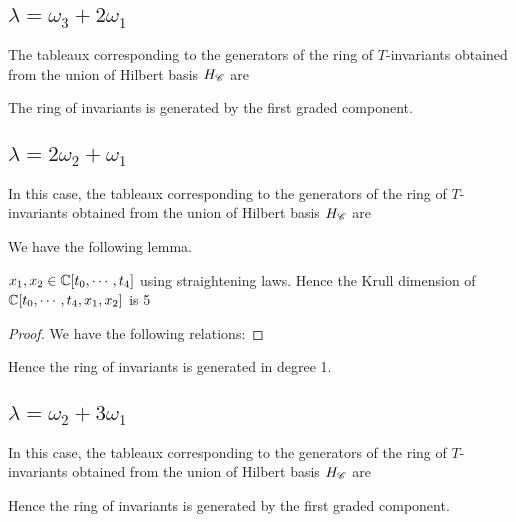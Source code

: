 \subsection{\(\lambda=\omega_3+2\omega_1\)}
\label{sec:fv_hb311}
The tableaux corresponding to the generators of the ring of $T$-invariants obtained from the union of Hilbert basis $H_{\mathscr{C}}$ are

The ring of invariants is generated by the first graded component.

\subsection{\(\lambda = 2\omega_2+\omega_1\)}
\label{sec:fv_hb221}
In this case, the tableaux corresponding to the generators of the ring of $T$-invariants obtained from the union of Hilbert basis $H_{\mathscr{C}}$ are

We have the following lemma.
\begin{lemma}
    \(x_1,x_2 \in \mathbb{C}[t_0,\cdots,t_4]\) using straightening laws. Hence the Krull dimension of \(\mathbb{C}[t_0,\cdots,t_4,x_1,x_2]\) is 5
\end{lemma}
\begin{proof}
    We have the following relations:
    
\end{proof}
Hence the ring of invariants is generated in degree 1.

\subsection{\(\lambda=\omega_2+3\omega_1\)}
\label{sec:fv_hb2111}
In this case, the tableaux corresponding to the generators of the ring of $T$-invariants obtained from the union of Hilbert basis $H_{\mathscr{C}}$ are

Hence the ring of invariants is generated by the first graded component.



